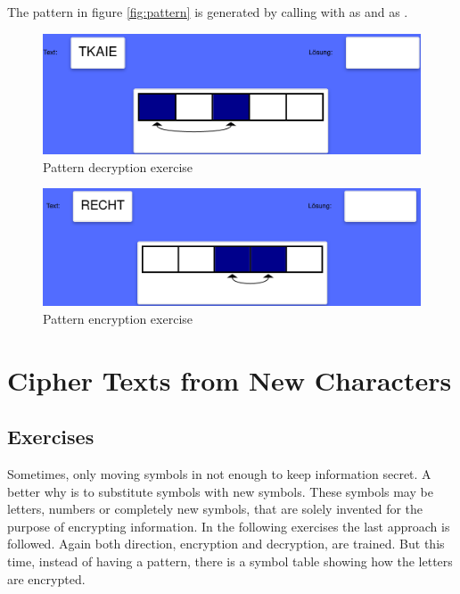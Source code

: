 \begin{example}
  The pattern in figure \ref{fig:pattern} is generated by calling  with  as  and \code{[[0, 4], [1, 2]]} as .
\end{example}

\begin{figure} 
    \centering
    \includegraphics[width=1.0 \columnwidth]{figures/pattern_decrypt.png}
    \caption{Pattern decryption exercise} 
    \label{fig:patternDecryption} 
\end{figure}

\begin{figure} 
    \centering
    \includegraphics[width=1.0 \columnwidth]{figures/pattern_encrypt.png}
    \caption{Pattern encryption exercise} 
    \label{fig:patternEncryption} 
\end{figure}

\section{Cipher Texts from New Characters}
\label{section:symbols}

\subsection{Exercises}
Sometimes, only moving symbols in not enough to keep information secret. A better why is to substitute symbols with new symbols. These symbols may be letters, numbers or completely new symbols, that are solely invented for the purpose of encrypting information.
In the following exercises the last approach is followed. Again both direction, encryption and decryption, are trained. But this time, instead of having a pattern, there is a symbol table showing how the letters are encrypted. 

